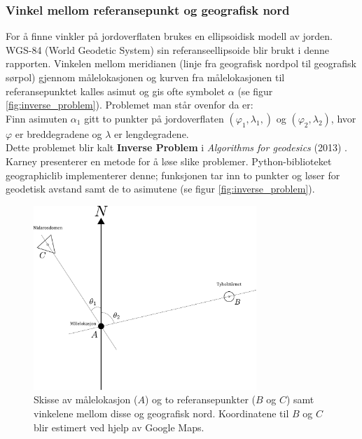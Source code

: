 \subsubsection{Vinkel mellom referansepunkt og geografisk nord}

For å finne vinkler på jordoverflaten brukes en ellipsoidisk modell av jorden.
WGS-84 (World Geodetic System) sin referanseellipsoide blir brukt i denne rapporten.
Vinkelen mellom meridianen (linje fra geografisk nordpol til geografisk sørpol) gjennom målelokasjonen og 
kurven fra målelokasjonen til referansepunktet kalles asimut \cite{asimut} og gis ofte symbolet $\alpha$ (se figur \ref{fig:inverse_problem}).
Problemet man står ovenfor da er:
\\

Finn asimuten $\alpha_1$ gitt to punkter på jordoverflaten $(\varphi_1, \lambda_1, )$ og $(\varphi_2, \lambda_2)$, hvor $\varphi$ er breddegradene og $\lambda$ er lengdegradene. 
\\

Dette problemet blir kalt \textbf{Inverse Problem} i \textit{Algorithms for geodesics} (2013) \cite{Karney}. Karney presenterer en metode for å løse slike problemer. Python-biblioteket geographiclib implementerer denne; funksjonen  tar inn to punkter og løser for geodetisk avstand samt de to asimutene \cite{geographiclib} (se figur \ref{fig:inverse_problem}).

\begin{figure}
    \centering
    \includegraphics[width=0.75\textwidth]{img/angle_north.pdf}
    \caption{
    Skisse av målelokasjon ($A$) og to referansepunkter ($B$ og $C$) samt vinkelene mellom disse og geografisk nord.
    Koordinatene til $B$ og $C$ blir estimert ved hjelp av Google Maps.}
    \label{fig:angle_north}
\end{figure}

